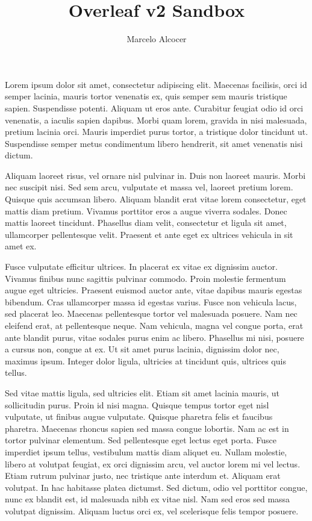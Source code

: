 \documentclass{article}
\title{Overleaf v2 Sandbox}
\author{Marcelo Alcocer}
\begin{document}
\maketitle

Lorem ipsum dolor sit amet, consectetur adipiscing elit. Maecenas facilisis, orci id semper lacinia, mauris tortor venenatis ex, quis semper sem mauris tristique sapien. Suspendisse potenti. Aliquam ut eros ante. Curabitur feugiat odio id orci venenatis, a iaculis sapien dapibus. Morbi quam lorem, gravida in nisi malesuada, pretium lacinia orci. Mauris imperdiet purus tortor, a tristique dolor tincidunt ut. Suspendisse semper metus condimentum libero hendrerit, sit amet venenatis nisi dictum.

Aliquam laoreet risus, vel ornare nisl pulvinar in. Duis non laoreet mauris. Morbi nec suscipit nisi. Sed sem arcu, vulputate et massa vel, laoreet pretium lorem. Quisque quis accumsan libero. Aliquam blandit erat vitae lorem consectetur, eget mattis diam pretium. Vivamus porttitor eros a augue viverra sodales. Donec mattis laoreet tincidunt. Phasellus diam velit, consectetur et ligula sit amet, ullamcorper pellentesque velit. Praesent et ante eget ex ultrices vehicula in sit amet ex.

Fusce vulputate efficitur ultrices. In placerat ex vitae ex dignissim auctor. Vivamus finibus nunc sagittis pulvinar commodo. Proin molestie fermentum augue eget ultricies. Praesent euismod auctor ante, vitae dapibus mauris egestas bibendum. Cras ullamcorper massa id egestas varius. Fusce non vehicula lacus, sed placerat leo. Maecenas pellentesque tortor vel malesuada posuere. Nam nec eleifend erat, at pellentesque neque. Nam vehicula, magna vel congue porta, erat ante blandit purus, vitae sodales purus enim ac libero. Phasellus mi nisi, posuere a cursus non, congue at ex. Ut sit amet purus lacinia, dignissim dolor nec, maximus ipsum. Integer dolor ligula, ultricies at tincidunt quis, ultrices quis tellus.

Sed vitae mattis ligula, sed ultricies elit. Etiam sit amet lacinia mauris, ut sollicitudin purus. Proin id nisi magna. Quisque tempus tortor eget nisl vulputate, ut finibus augue vulputate. Quisque pharetra felis et faucibus pharetra. Maecenas rhoncus sapien sed massa congue lobortis. Nam ac est in tortor pulvinar elementum. Sed pellentesque eget lectus eget porta. Fusce imperdiet ipsum tellus, vestibulum mattis diam aliquet eu. Nullam molestie, libero at volutpat feugiat, ex orci dignissim arcu, vel auctor lorem mi vel lectus. Etiam rutrum pulvinar justo, nec tristique ante interdum et. Aliquam erat volutpat. In hac habitasse platea dictumst. Sed dictum, odio vel porttitor congue, nunc ex blandit est, id malesuada nibh ex vitae nisl. Nam sed eros sed massa volutpat dignissim. Aliquam luctus orci ex, vel scelerisque felis tempor posuere.
\end{document}
